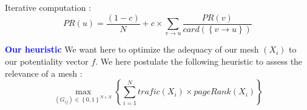 \documentclass[a4, 14pts]{seminar}
\begin{document}
{{\begin{slide}
\begin{equation}
	    \end{equation} 
	    Iterative computation :
	    \begin{equation}
	    PR\left(u\right)= \frac{\left(1-c\right)}{N} + c \times \sum_{v \rightarrow u}\frac{PR\left(v\right)}{card\left(\left\{v\rightarrow u\right\}\right)}
	    \end{equation}
	    \end{slide}
	    \begin{slide}
	    \textbf{\textcolor{blue}{\large Our heuristic}}\newline 
	    We want here to optimize the adequacy of our mesh $\left(X_i\right)$ to our potentiality vector $f$.
	    We here postulate the following heuristic to assess the relevance of a mesh :
	    \begin{equation}
	    \max_{\left(G_{ij}\right)  \in \left\{0,1\right\}^{N\times N}}\left\{ \sum^{N}_{i=1} trafic\left(X_i\right)\times pageRank(X_i)\right\}
	    \end{equation} 
	    \end{slide}

}}
\end{document}

